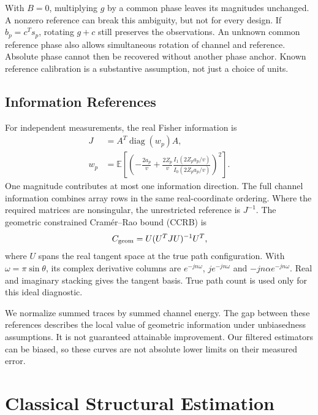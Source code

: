 \documentclass[10pt,journal,letterpaper]{IEEEtran}
\DeclareMathOperator{\diag}{diag}
\begin{document}
With $B=0$, multiplying $g$ by a common phase leaves its magnitudes unchanged. A nonzero reference can break this ambiguity, but not for every design. If $b_p=c^Ts_p$, rotating $g+c$ still preserves the observations. An unknown common reference phase also allows simultaneous rotation of channel and reference. Absolute phase cannot then be recovered without another phase anchor. Known reference calibration is a substantive assumption, not just a choice of units.

\subsection{Information References}
For independent measurements, the real Fisher information is
\begin{align}
 J&=A^T\diag(w_p)A,\nonumber\\
 w_p&=\mathbb E\!\left[\left(-\frac{2a_p}{v}+\frac{2Z_p}{v}
 \frac{I_1(2Z_pa_p/v)}{I_0(2Z_pa_p/v)}\right)^2\right].
\end{align}
One magnitude contributes at most one information direction. The full channel information combines array rows in the same real-coordinate ordering. Where the required matrices are nonsingular, the unrestricted reference is $J^{-1}$. The geometric constrained Cram\'er--Rao bound (CCRB) is~\cite{stoica1998}
\begin{equation}
 C_{\rm geom}=U(U^TJU)^{-1}U^T,
 \label{eq:ccrb}
\end{equation}
where $U$ spans the real tangent space at the true path configuration. With $\omega=\pi\sin\theta$, its complex derivative columns are $e^{-jn\omega}$, $je^{-jn\omega}$ and $-jn\alpha e^{-jn\omega}$. Real and imaginary stacking gives the tangent basis. True path count is used only for this ideal diagnostic.

We normalize summed traces by summed channel energy. The gap between these references describes the local value of geometric information under unbiasedness assumptions. It is not guaranteed attainable improvement. Our filtered estimators can be biased, so these curves are not absolute lower limits on their measured error.

\section{Classical Structural Estimation}
\end{document}
